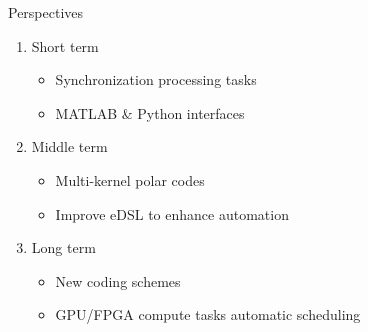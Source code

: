 \begin{frame}{Perspectives}
  \vfill
  \begin{enumerate}
    \item Short term
    \begin{itemize}
      \item Synchronization processing tasks
      \item MATLAB \& Python interfaces
    \end{itemize}
    \vspace{0.3cm}
    \pause
    \item Middle term
    \begin{itemize}
      \item Multi-kernel polar codes
      \item Improve eDSL to enhance automation
    \end{itemize}
    \vspace{0.3cm}
    \pause
    \item Long term
    \begin{itemize}
      \item New coding schemes
      \item GPU/FPGA compute tasks automatic scheduling
    \end{itemize}
  \end{enumerate}
  \vfill
\end{frame}
